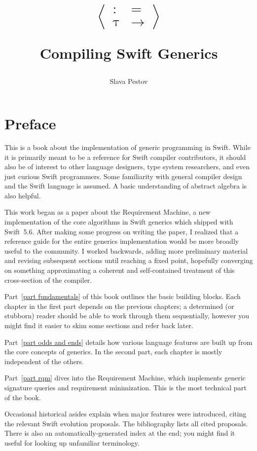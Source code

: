 \documentclass[a4paper,headsepline,bibliography=totoc,toc=flat,fleqn,twoside=semi]{scrbook}
\title{\begin{center}
$\left<
\begin{array}{cc}
:&=
\\
\uptau&\rightarrow
\end{array}
\right>$
\end{center}
\bigskip
Compiling Swift Generics}
\author{Slava Pestov}
\theoremstyle{definition}
\theoremstyle{definition}
\theoremstyle{definition}
\begin{document}
\maketitle

\chapter*{Preface}

This is a book about the implementation of generic programming in Swift. While it is primarily meant to be a reference for Swift compiler contributors, it should also be of interest to other language designers, type system researchers, and even just curious Swift programmers. Some familiarity with general compiler design and the Swift language is assumed. A basic understanding of abstract algebra is also helpful.

This work began as a paper about the Requirement Machine, a new implementation of the core algorithms in Swift generics which shipped with Swift~5.6. After making some progress on writing the paper, I realized that a reference guide for the entire generics implementation would be more broadly useful to the community. I worked backwards, adding more preliminary material and revising subsequent sections until reaching a fixed point, hopefully converging on something approximating a coherent and self-contained treatment of this cross-section of the compiler.

Part~\ref{part fundamentals} of this book outlines the basic building blocks. Each chapter in the first part depends on the previous chapters; a determined (or stubborn) reader should be able to work through them sequentially, however you might find it easier to skim some sections and refer back later.

Part~\ref{part odds and ends} details how various language features are built up from the core concepts of generics. In the second part, each chapter is mostly independent of the others. 

Part~\ref{part rqm} dives into the Requirement Machine, which implements generic signature queries and requirement minimization. This is the most technical part of the book.

Occasional historical asides explain when major features were introduced, citing the relevant Swift evolution proposals. The bibliography lists all cited proposals. There is also an automatically-generated index at the end; you might find it useful for looking up unfamiliar terminology.
\end{document}
